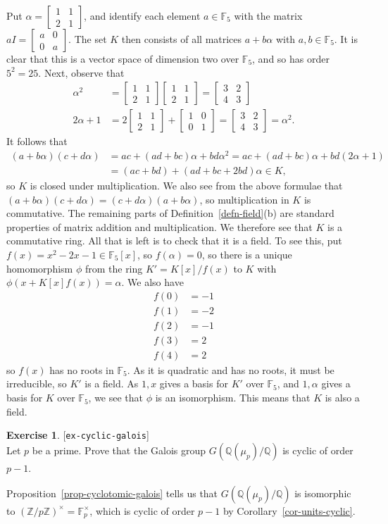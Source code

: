 \documentclass{amsart}
\newcommand{\Z}         {{\mathbb{Z}}}
\newcommand{\Q}         {{\mathbb{Q}}}
\newcommand{\F}         {{\mathbb{F}}}
\newcommand{\al}        {\alpha}
\newcommand{\bsm}       {\left[\begin{smallmatrix}}
\newcommand{\esm}       {\end{smallmatrix}\right]}
\newcommand{\tm}        {\times}
\renewcommand{\:}{\colon}
\newcommand{\lastexlabel}{}
\newcommand{\exlabel}[1]{
 \global\def\lastexlabel{#1}\label{#1}[\texttt{#1}]\ \\
}
\newcommand{\exlabel}[1]{
 \global\def\lastexlabel{#1}\label{#1}
}
\newenvironment{solution}{\SolutionInline}{\endSolutionInline}
\theoremstyle{definition}
\newtheorem{exercise}{Exercise}[section]
\renewenvironment{solution}{\SolutionAtEnd}{\endSolutionAtEnd}
\begin{document}
\begin{solution}
 Put $\al=\bsm 1&1\\2&1\esm$, and identify each element $a\in\F_5$
 with the matrix $aI=\bsm a&0\\ 0&a\esm$.  The set $K$ then consists
 of all matrices $a+b\al$ with $a,b\in\F_5$.  It is clear that this is
 a vector space of dimension two over $\F_5$, and so has order
 $5^2=25$.  Next, observe that 
 \begin{align*}
  \al^2 &= \bsm 1&1\\ 2&1\esm \bsm 1&1\\ 2&1\esm 
         = \bsm 3&2 \\ 4&3 \esm \\
  2\al+1 &= 2\bsm 1&1\\ 2&1\esm + \bsm 1&0\\ 0&1\esm 
          = \bsm 3&2 \\ 4&3 \esm = \al^2.
 \end{align*}
 It follows that 
 \begin{align*}
  (a+b\al)(c+d\al) &= 
    ac+(ad+bc)\al+bd\al^2 = ac+(ad+bc)\al+bd(2\al+1) \\
    &= (ac+bd)+(ad+bc+2bd)\al \in K, 
 \end{align*}
 so $K$ is closed under multiplication.  We also see from the above
 formulae that $(a+b\al)(c+d\al)=(c+d\al)(a+b\al)$, so multiplication
 in $K$ is commutative.  The remaining parts of
 Definition~\ref{defn-field}(b) are standard properties of matrix
 addition and multiplication.  We therefore see that $K$ is a
 commutative ring.  All that is left is to check that it is a field.
 To see this, put $f(x)=x^2-2x-1\in\F_5[x]$, so $f(\al)=0$, so there
 is a unique homomorphism $\phi$ from the ring $K'=K[x]/f(x)$ to $K$
 with $\phi(x+K[x]f(x))=\al$.  We also have
 \begin{align*}
  f(0) &= -1 \\
  f(1) &= -2 \\
  f(2) &= -1 \\
  f(3) &= 2 \\
  f(4) &= 2
 \end{align*}
 so $f(x)$ has no roots in $\F_5$.  As it is quadratic and has no
 roots, it must be irreducible, so $K'$ is a field.  As $1,x$ gives a
 basis for $K'$ over $\F_5$, and $1,\al$ gives a basis for $K$ over
 $\F_5$, we see that $\phi$ is an isomorphism.  This means that $K$ is
 also a field. 
\end{solution}
\begin{exercise}\exlabel{ex-cyclic-galois}
 Let $p$ be a prime.  Prove that the Galois group $G(\Q(\mu_p)/\Q)$ is
 cyclic of order $p-1$.
\end{exercise}
\begin{solution}
 Proposition~\ref{prop-cyclotomic-galois} tells us that
 $G(\Q(\mu_p)/\Q)$ is isomorphic to $(\Z/p\Z)^\tm=\F_p^\tm$, which is
 cyclic of order $p-1$ by Corollary~\ref{cor-units-cyclic}.
\end{solution}
\end{document}
